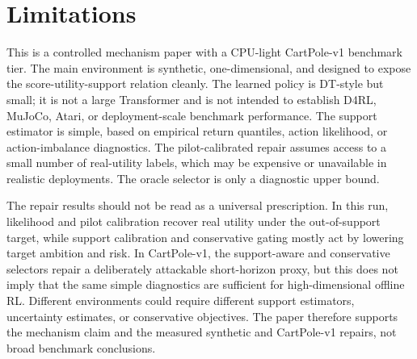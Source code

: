\section{Limitations}
\label{sec:limitations}

This is a controlled mechanism paper with a CPU-light CartPole-v1 benchmark tier. The main environment is synthetic, one-dimensional, and designed to expose the score-utility-support relation cleanly. The learned policy is DT-style but small; it is not a large Transformer and is not intended to establish D4RL, MuJoCo, Atari, or deployment-scale benchmark performance. The support estimator is simple, based on empirical return quantiles, action likelihood, or action-imbalance diagnostics. The pilot-calibrated repair assumes access to a small number of real-utility labels, which may be expensive or unavailable in realistic deployments. The oracle selector is only a diagnostic upper bound.

The repair results should not be read as a universal prescription. In this run, likelihood and pilot calibration recover real utility under the out-of-support target, while support calibration and conservative gating mostly act by lowering target ambition and risk. In CartPole-v1, the support-aware and conservative selectors repair a deliberately attackable short-horizon proxy, but this does not imply that the same simple diagnostics are sufficient for high-dimensional offline RL. Different environments could require different support estimators, uncertainty estimates, or conservative objectives. The paper therefore supports the mechanism claim and the measured synthetic and CartPole-v1 repairs, not broad benchmark conclusions.
